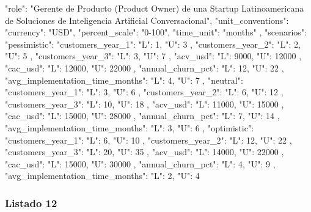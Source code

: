 \begin{APACode}
{
  "role": "Gerente de Producto (Product Owner) de una Startup Latinoamericana de Soluciones de Inteligencia Artificial Conversacional",
  "unit_conventions": {
    "currency": "USD",
    "percent_scale": "0-100",
    "time_unit": "months"
  },
  "scenarios": {
    "pessimistic": {
      "customers_year_1": {
        "L": 1,
        "U": 3
      },
      "customers_year_2": {
        "L": 2,
        "U": 5
      },
      "customers_year_3": {
        "L": 3,
        "U": 7
      },
      "acv_usd": {
        "L": 9000,
        "U": 12000
      },
      "cac_usd": {
        "L": 12000,
        "U": 22000
      },
      "annual_churn_pct": {
        "L": 12,
        "U": 22
      },
      "avg_implementation_time_months": {
        "L": 4,
        "U": 7
      }
    },
    "neutral": {
      "customers_year_1": {
        "L": 3,
        "U": 6
      },
      "customers_year_2": {
        "L": 6,
        "U": 12
      },
      "customers_year_3": {
        "L": 10,
        "U": 18
      },
      "acv_usd": {
        "L": 11000,
        "U": 15000
      },
      "cac_usd": {
        "L": 15000,
        "U": 28000
      },
      "annual_churn_pct": {
        "L": 7,
        "U": 14
      },
      "avg_implementation_time_months": {
        "L": 3,
        "U": 6
      }
    },
    "optimistic": {
      "customers_year_1": {
        "L": 6,
        "U": 10
      },
      "customers_year_2": {
        "L": 12,
        "U": 22
      },
      "customers_year_3": {
        "L": 20,
        "U": 35
      },
      "acv_usd": {
        "L": 14000,
        "U": 22000
      },
      "cac_usd": {
        "L": 15000,
        "U": 30000
      },
      "annual_churn_pct": {
        "L": 4,
        "U": 9
      },
      "avg_implementation_time_months": {
        "L": 2,
        "U": 4
      }
    }
  }
}
\end{APACode}

\subsubsection{Listado 12}
\label{anexo:code-6-3-2-12}

